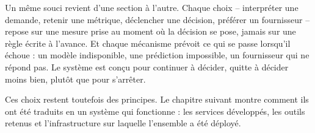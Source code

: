 Un même souci revient d'une section à l'autre. Chaque choix -- interpréter une demande, retenir une métrique, déclencher une décision, préférer un fournisseur -- repose sur une mesure prise au moment où la décision se pose, jamais sur une règle écrite à l'avance. Et chaque mécanisme prévoit ce qui se passe lorsqu'il échoue : un modèle indisponible, une prédiction impossible, un fournisseur qui ne répond pas. Le système est conçu pour continuer à décider, quitte à décider moins bien, plutôt que pour s'arrêter.

Ces choix restent toutefois des principes. Le chapitre suivant montre comment ils ont été traduits en un système qui fonctionne : les services développés, les outils retenus et l'infrastructure sur laquelle l'ensemble a été déployé.